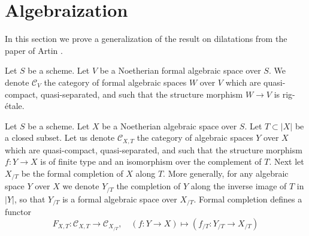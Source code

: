 \section{Algebraization}
\label{section-algebraization}

\noindent
In this section we prove a generalization of the result on dilatations
from the paper of Artin \cite{ArtinII}. 

\medskip\noindent
Let $S$ be a scheme. Let $V$ be a Noetherian formal algebraic space
over $S$. We denote $\mathcal{C}_V$ the category of formal algebraic
spaces $W$ over $V$ which are quasi-compact, quasi-separated, and such
that the structure morphism $W \to V$ is rig-\'etale.

\medskip\noindent
Let $S$ be a scheme. Let $X$ be a Noetherian algebraic space over $S$.
Let $T \subset |X|$ be a closed subset. Let us denote $\mathcal{C}_{X, T}$
the category of algebraic spaces $Y$ over $X$ which are quasi-compact,
quasi-separated, and such that the structure morphism $f : Y \to X$
is of finite type and an isomorphism over the complement of $T$.
Next let $X_{/T}$ be the formal completion of $X$ along $T$.
More generally, for any algebraic space $Y$ over $X$ we
denote $Y_{/T}$ the completion of $Y$ along the inverse image of
$T$ in $|Y|$, so that $Y_{/T}$ is a formal algebraic space over $X_{/T}$.
Formal completion defines a functor
\begin{equation}
\label{equation-completion-functor}
F_{X, T} : \mathcal{C}_{X, T} \longrightarrow \mathcal{C}_{X_{/T}},\quad
(f : Y \to X) \longmapsto (f_{/T} : Y_{/T} \to X_{/T})
\end{equation}

